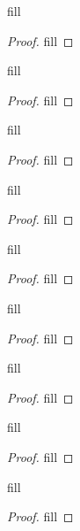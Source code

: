 \begin{exercise}{20}
fill
\end{exercise}
\begin{proof}
fill
\end{proof} 

\begin{exercise}{21}
fill
\end{exercise}
\begin{proof}
fill
\end{proof} 

\begin{exercise}{22}
fill
\end{exercise}
\begin{proof}
fill
\end{proof} 

\begin{exercise}{23}
fill
\end{exercise}
\begin{proof}
fill
\end{proof} 

\begin{exercise}{25}
fill
\end{exercise}
\begin{proof}
fill
\end{proof} 

\begin{exercise}{30}
fill
\end{exercise}
\begin{proof}
fill
\end{proof} 

\begin{exercise}{31}
fill
\end{exercise}
\begin{proof}
fill
\end{proof} 

\begin{exercise}{32}
fill
\end{exercise}
\begin{proof}
fill
\end{proof} 

\begin{exercise}{36}
fill
\end{exercise}
\begin{proof}
fill
\end{proof} 
